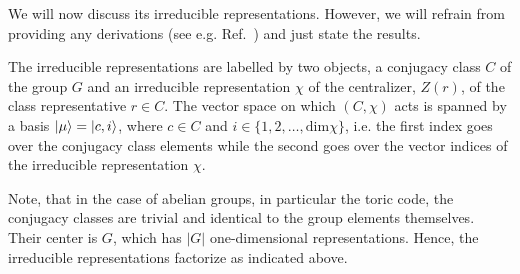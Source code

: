 \documentclass[two column]{article}
\newcommand{\caro}[1]{\textcolor{red}{[#1]}}
\begin{document}
%
 

We will now discuss its irreducible representations. However, we will refrain from providing any derivations (see e.g. Ref.~\cite{Cui_2015}) and just state the results. 

The irreducible representations are labelled by two objects, a conjugacy class $C$ of the group $G$ and an irreducible representation $\chi$ of the centralizer, $Z(r)$, of the class representative $r \in C$. The vector space on which $(C, \chi)$ acts is spanned by a basis $\ket{\mu} = \ket{c, i}$, where $c \in C$ and $i \in \{1, 2, \ldots, \text{dim}\chi\}$, i.e. the first index goes over the conjugacy class elements while the second goes over the vector indices of the irreducible representation $\chi$.

Note, that in the case of abelian groups, in particular the toric code, the conjugacy classes are trivial and identical to the group elements themselves. Their center is $G$, which has $|G|$ one-dimensional representations. Hence, the irreducible representations factorize as indicated above. 
\end{document}

